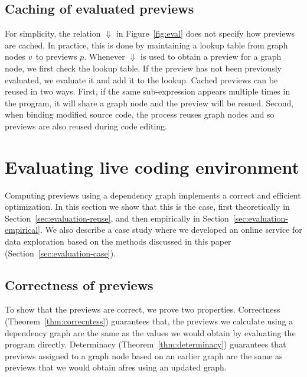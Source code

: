 \documentclass[english,submission]{programming}
\theoremstyle{plain}
\theoremstyle{definition}
\newcommand{\bndclr}[1]{\textcolor{kvdclr}{#1}}
\begin{document}
\subsection{Caching of evaluated previews}
\label{sec:previews-cache}

For simplicity, the relation $\Downarrow$ in Figure~\ref{fig:eval} does not specify how previews
are cached. In practice, this is done by maintaining a lookup table from graph nodes $\bndclr{v}$
to previews $p$. Whenever $\Downarrow$ is used to obtain a preview for a graph node, we first
check the lookup table. If the preview has not been previously evaluated, we evaluate it and add
it to the lookup. Cached previews can be reused in two ways. First, if the same sub-expression
appears multiple times in the program, it will share a graph node and the preview will be resued.
Second, when binding modified source code, the process reuses graph nodes and so previews are
also reused during code editing.


\section{Evaluating live coding environment}
\label{sec:evaluation}

Computing previews using a dependency graph implements a correct and efficient optimization.
In this section we show that this is the case, first theoretically in Section~\ref{sec:evaluation-reuse},
and then empirically in Section~\ref{sec:evaluation-empirical}. We also describe a case study where
we developed an online service for data exploration based on the methods discussed in this paper
(Section~\ref{sec:evaluation-case}).


\subsection{Correctness of previews}
\label{sec:evaluation-correctness}

To show that the previews are correct, we prove two properties. Correctness (Theorem~\ref{thm:correcntess})
guarantees that, the previews we calculate using a dependency graph are the same as the values we
would obtain by evaluating the program directly. Determinacy (Theorem~\ref{thm:determinacy})
guarantees that previews assigned to a graph node based on an earlier graph are the same as
previews that we would obtain afres using an updated graph.
\end{document}
